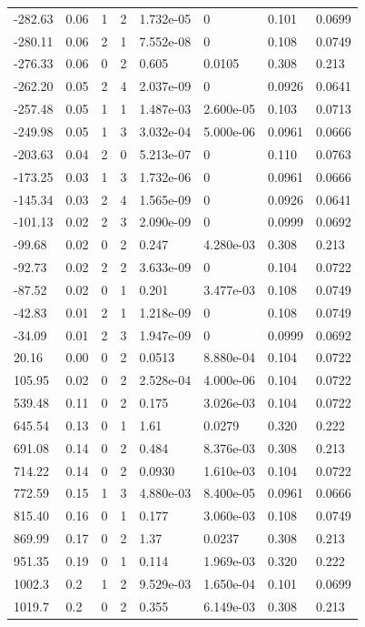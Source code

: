 \documentclass[preview]{standalone}
\begin{document}
{{\begin{tabular}{L{1.2cm}C{1.2cm} C{0.3cm}C{0.5cm} C{1.4cm}C{1.4cm} C{1.4cm}C{1.4cm}}
  -282.63  &  0.06  & 1     &  2 &  1.732e-05  & 0  & 0.101 &  0.0699   \\ 
  -280.11  &  0.06  & 2     &  1 &  7.552e-08  & 0  & 0.108 &  0.0749   \\ 
  -276.33  &  0.06  & 0     &  2 &  0.605  & 0.0105  & 0.308 &  0.213   \\ 
  -262.20  &  0.05  & 2     &  4 &  2.037e-09  & 0  & 0.0926 &  0.0641   \\ 
  -257.48  &  0.05  & 1     &  1 &  1.487e-03  & 2.600e-05  & 0.103 &  0.0713   \\ 
  -249.98  &  0.05  & 1     &  3 &  3.032e-04  & 5.000e-06  & 0.0961 &  0.0666   \\ 
  -203.63  &  0.04  & 2     &  0 &  5.213e-07  & 0  & 0.110 &  0.0763   \\ 
  -173.25  &  0.03  & 1     &  3 &  1.732e-06  & 0  & 0.0961 &  0.0666   \\ 
  -145.34  &  0.03  & 2     &  4 &  1.565e-09  & 0  & 0.0926 &  0.0641   \\ 
  -101.13  &  0.02  & 2     &  3 &  2.090e-09  & 0  & 0.0999 &  0.0692   \\ 
  -99.68  &  0.02  & 0     &  2 &  0.247  & 4.280e-03  & 0.308 &  0.213   \\ 
  -92.73  &  0.02  & 2     &  2 &  3.633e-09  & 0  & 0.104 &  0.0722   \\ 
  -87.52  &  0.02  & 0     &  1 &  0.201  & 3.477e-03  & 0.108 &  0.0749   \\ 
  -42.83  &  0.01  & 2     &  1 &  1.218e-09  & 0  & 0.108 &  0.0749   \\ 
  -34.09  &  0.01  & 2     &  3 &  1.947e-09  & 0  & 0.0999 &  0.0692   \\ 
  20.16  &  0.00  & 0     &  2 &  0.0513  & 8.880e-04  & 0.104 &  0.0722   \\ 
  105.95  &  0.02  & 0     &  2 &  2.528e-04  & 4.000e-06  & 0.104 &  0.0722   \\ 
  539.48  &  0.11  & 0     &  2 &  0.175  & 3.026e-03  & 0.104 &  0.0722   \\ 
  645.54  &  0.13  & 0     &  1 &  1.61  & 0.0279  & 0.320 &  0.222   \\ 
  691.08  &  0.14  & 0     &  2 &  0.484  & 8.376e-03  & 0.308 &  0.213   \\ 
  714.22  &  0.14  & 0     &  2 &  0.0930  & 1.610e-03  & 0.104 &  0.0722   \\ 
  772.59  &  0.15  & 1     &  3 &  4.880e-03  & 8.400e-05  & 0.0961 &  0.0666   \\ 
  815.40  &  0.16  & 0     &  1 &  0.177  & 3.060e-03  & 0.108 &  0.0749   \\ 
  869.99  &  0.17  & 0     &  2 &  1.37  & 0.0237  & 0.308 &  0.213   \\ 
  951.35  &  0.19  & 0     &  1 &  0.114  & 1.969e-03  & 0.320 &  0.222   \\ 
  1002.3  &   0.2  & 1     &  2 &  9.529e-03  & 1.650e-04  & 0.101 &  0.0699   \\ 
  1019.7  &   0.2  & 0     &  2 &  0.355  & 6.149e-03  & 0.308 &  0.213   \\ 
\hline 
\end{tabular} 

}}
\end{document}
